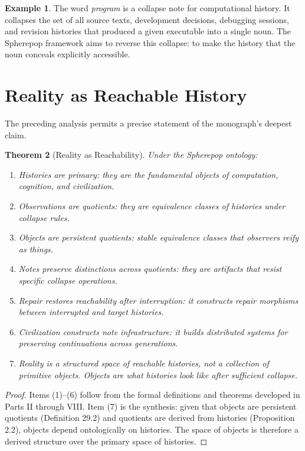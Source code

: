 \documentclass[12pt, a4paper, openany]{book}
\theoremstyle{plain}
\newtheorem{theorem}{Theorem}[chapter]
\theoremstyle{definition}
\newtheorem{example}[theorem]{Example}
\theoremstyle{remark}
\begin{document}
\begin{example}
The word \emph{program} is a collapse note for computational history. It collapses
the set of all source texts, development decisions, debugging sessions, and
revision histories that produced a given executable into a single noun. The Spherepop
framework aims to reverse this collapse: to make the history that the noun
conceals explicitly accessible.
\end{example}

\section{Reality as Reachable History}

The preceding analysis permits a precise statement of the monograph's deepest claim.

\begin{theorem}[Reality as Reachability]
Under the Spherepop ontology:
\begin{enumerate}
\item Histories are primary: they are the fundamental objects of computation, cognition, and civilization.
\item Observations are quotients: they are equivalence classes of histories under collapse rules.
\item Objects are persistent quotients: stable equivalence classes that observers reify as things.
\item Notes preserve distinctions across quotients: they are artifacts that resist specific collapse operations.
\item Repair restores reachability after interruption: it constructs repair morphisms between interrupted and target histories.
\item Civilization constructs note infrastructure: it builds distributed systems for preserving continuations across generations.
\item Reality is a structured space of reachable histories, not a collection of primitive objects. Objects are what histories look like after sufficient collapse. 
\end{enumerate}
\end{theorem}

\begin{proof}
Items (1)--(6) follow from the formal definitions and theorems developed in
Parts II through VIII. Item (7) is the synthesis: given that objects are
persistent quotients (Definition 29.2) and quotients are derived from histories
(Proposition 2.2), objects depend ontologically on histories. The space of
objects is therefore a derived structure over the primary space of histories.
\end{proof}
\end{document}
